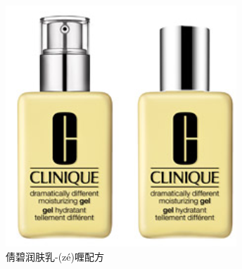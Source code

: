 \begin{figure}[htbp]
\begin{minipage}{.6\linewidth}
\centering\includegraphics[width=.9\linewidth]{figures/hua-4.png}
\caption{倩碧润肤乳-(zé)喱配方}
\end{minipage}
\end{figure} 


